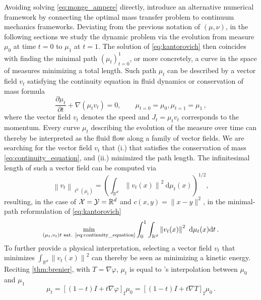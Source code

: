 Avoiding solving \eqref{eq:monge_ampere} directly, \citet{benamou2000computational} introduce an alternative numerical framework by connecting the optimal mass transfer problem to continuum mechanics frameworks.
Deviating from the previous notation of $(\mu, \nu)$, in the following sections we study the dynamic problem via the evolution from measure $\mu_0$ at time $t=0$ to $\mu_1$ at $t=1$. The solution of \eqref{eq:kantorovich} then coincides with finding the minimal path $(\mu_t)_{t=0}^1$, or more concretely, a curve in the space of measures minimizing a total length.  
Such path $\mu_t$ can be described by a vector field $v_t$ satisfying the continuity equation in fluid dynamics or conservation of mass formula
\begin{equation} \label{eq:continuity_equation}
	\frac{\partial \mu_t}{\partial t}+\nabla\left(\mu_t v_t\right)= 0, \qquad \mu_{t=0}=\mu_0, \mu_{t=1}=\mu_1\,,
\end{equation}
where the vector field $v_t$ denotes the speed and $J_t = \mu_t v_t$ corresponds to the momentum. 
Every curve $\mu_t$ describing the evolution of the measure over time can thereby be interpreted as the fluid flow along a family of vector fields. We are searching for the vector field $v_t$ that (i.) that satisfies the conservation of mass \eqref{eq:continuity_equation}, and (ii.) minimized the path length.
The infinitesimal length of such a vector field can be computed via 
\begin{equation*}
	\left\|v_t\right\|_{\ell^2\left(\mu_t\right)}=\left(\int_{\mathbb{R}^d}\left\|v_t(x)\right\|^2 \mathrm{~d} \mu_t(x)\right)^{1 / 2},
\end{equation*}
resulting, in the case of ${\mathcal{X}} = {\mathcal{Y}} = \mathbb{R}^d$ and $c(x, y)=\|x-y\|^2$, in the minimal-path reformulation of \eqref{eq:kantorovich}
\begin{equation} \label{eq:benamou_brenier}
	\min _{\left(\mu_t, v_t\right) t \text { sat. \eqref{eq:continuity_equation}}} \int_0^1 \int_{\mathbb{R}^d}\left\|v_t(x)\right\|^2 \mathrm{~d} \mu_t(x) \mathrm{d} t\,.
\end{equation}
To further provide a physical interpretation, selecting a vector field $v_t$ that minimizes $\int_{\mathbb{R}^d}\left\|v_t(x)\right\|^2$ can thereby be seen as minimizing a kinetic energy.
Reciting \cref{thm:brenier}, with $T = \nabla \varphi$, $\mu_t$ is equal to \citeauthor{mccann1997convexity}'s interpolation between $\mu_0$ and $\mu_1$
\begin{equation} \label{eq:mccann_interpolation}
	\mu_t = [(1-t) I+t \nabla \varphi]_\sharp \mu_0 = [(1-t) I+t \nabla T]_\sharp \mu_0\,.
\end{equation}


